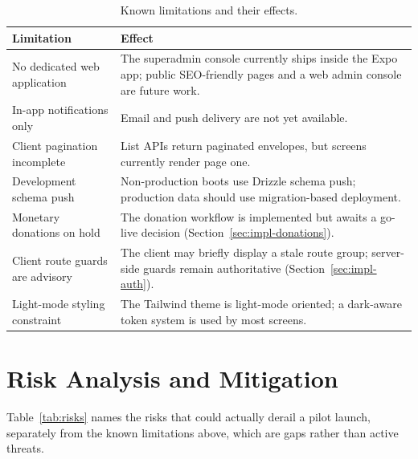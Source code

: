 \begin{table}[H]\centering
\caption{Known limitations and their effects.}
\label{tab:limitations}
\begin{tabularx}{\textwidth}{|p{}|X|}
\hline
\textbf{Limitation} & \textbf{Effect}\\\hline
No dedicated web application & The superadmin console currently ships inside the Expo app; public SEO-friendly pages and a web admin console are future work.\\\hline
In-app notifications only & Email and push delivery are not yet available.\\\hline
Client pagination incomplete & List APIs return paginated envelopes, but screens currently render page one.\\\hline
Development schema push & Non-production boots use Drizzle schema push; production data should use migration-based deployment.\\\hline
Monetary donations on hold & The donation workflow is implemented but awaits a go-live decision (Section~\ref{sec:impl-donations}).\\\hline
Client route guards are advisory & The client may briefly display a stale route group; server-side guards remain authoritative (Section~\ref{sec:impl-auth}).\\\hline
Light-mode styling constraint & The Tailwind theme is light-mode oriented; a dark-aware token system is used by most screens.\\\hline
\end{tabularx}
\end{table}

\section{Risk Analysis and Mitigation}
\label{sec:risks}
Table~\ref{tab:risks} names the risks that could actually derail a pilot launch, separately from the known limitations above, which are gaps rather than active threats.


